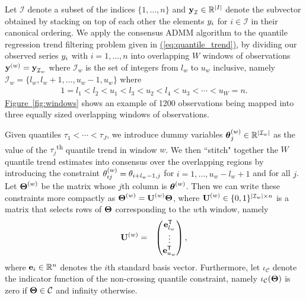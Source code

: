\documentclass[12pt]{article}
\newcommand{\Eqn}[1]{\hyperref[eq:#1]{{\rm (\ref*{eq:#1})}}} %
\newcommand{\Fig}[1]{\hyperref[fig:#1]{Figure~\ref*{fig:#1}}} %
\newcommand{\Eqn}[1]{{(\ref{eq:#1})}} %
\newcommand{\Fig}[1]{{Figure~\ref{fig:#1}}} %
\newcommand{\Real}{\mathbb{R}}
\newcommand{\Tra}{^{\sf T}} %
\newcommand{\V}[1]{{\bm{\mathbf{\MakeLowercase{#1}}}}} %
\newcommand{\VE}[2]{\MakeLowercase{#1}_{#2}} %
\newcommand{\Vn}[2]{\V{#1}^{(#2)}} %
\newcommand{\VnE}[3]{{#1}^{(#2)}_{#3}} %
\newcommand{\M}[1]{{\bm{\mathbf{\MakeUppercase{#1}}}}} %
\newcommand{\Mn}[2]{\M{#1}^{(#2)}} %
\begin{document}
	
	
	Let $\mathcal{I}$ denote a subset of the indices $\{1, \ldots, n\}$ and $\V{y}_\mathcal{I} \in \Real^{\lvert I \rvert}$ denote the subvector obtained by stacking on top of each other the elements $\VE{y}{i}$ for $i \in \mathcal{I}$ in their canonical ordering.	
	We apply the consensus ADMM algorithm to the quantile regression trend filtering problem given in \Eqn{quantile_trend}, by dividing our observed series $\VE{y}{i}$ with $i = 1, \ldots, n$ into overlapping $W$ windows of observations $\Vn{y}{w} = \V{y}_{\mathcal{I}_w}$ where $\mathcal{I}_w$ is the set of integers from $l_w$ to $u_w$ inclusive, namely $\mathcal{I}_w = \{l_w, l_w + 1, \ldots, u_w -1, u_w\}$ where 
\begin{eqnarray*}
1 = l_{1} < l_{2} < u_{1} < l_{3} < u_{2} < l_{4} < u_{3} < \cdots < u_{W} = n.
\end{eqnarray*}
\Fig{windows} shows an example of 1200 observations being mapped into three equally sized overlapping windows of observations. 
		
%
Given quantiles $\tau_1 < \cdots < \tau_J$, we introduce dummy variables $\Vn{\theta}{w}_{j} \in \Real^{\lvert \mathcal{I}_w \rvert}$ as the value of the $\tau_j$\textsuperscript{th} quantile trend in window $w$. We then ``stitch" together the $W$ quantile trend estimates into consensus over the overlapping regions by introducing the constraint $\VnE{\theta}{w}{ij} = \VE{\theta}{i + l_w - 1,j}$ for $i = 1, \ldots, u_w - l_w + 1$ and for all $j$. Let $\Mn{\Theta}{w}$ be the matrix whose $j$th column is $\Vn{\theta}{w}$. Then we can write these constraints more compactly as $\Mn{\Theta}{w} = \Mn{U}{w}\M{\Theta}$, where $\Mn{U}{w} \in \{0, 1\}^{\lvert \mathcal{I}_w \rvert \times n}$ is a matrix that selects rows of $\M{\Theta}$ corresponding to the $w$th window, namely
\begin{eqnarray*}
\Mn{U}{w} & = & \begin{pmatrix}
\V{e}_{l_w}\Tra \\
\vdots \\
\V{e}_{u_w}\Tra
\end{pmatrix},
\end{eqnarray*}
where $\V{e}_i \in \Real^{n}$ denotes the $i$th standard basis vector. Furthermore, let $\iota_{\mathcal{C}}$ denote the indicator function of the non-crossing quantile constraint, namely $\iota_{\mathcal{C}}(\M{\Theta})$ is zero if $\M{\Theta} \in \mathcal{C}$ and infinity otherwise.
	 
\end{document}
